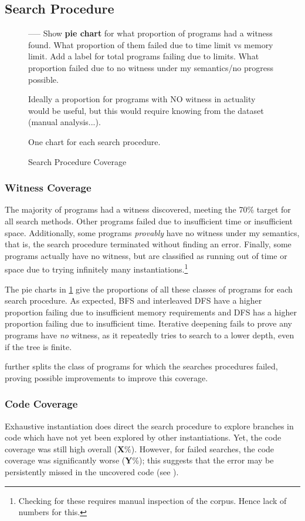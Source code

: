 \subsection{Search Procedure}

\begin{figure}
\centering
-----
Show \textbf{pie chart} for what proportion of programs had a witness found. What proportion of them failed due to time limit vs memory limit. Add a label for total programs failing due to limits. What proportion failed due to no witness under my semantics/no progress possible.

Ideally a proportion for programs with NO witness in actuality would be useful, but this would require knowing from the dataset (manual analysis...).

One chart for each search procedure.
\caption{Search Procedure Coverage}
\label{fig:PieChart}
\end{figure}

\subsubsection{Witness Coverage}
The majority of programs had a witness discovered, meeting the 70\% target for all search methods. Other programs failed due to insufficient time or insufficient space. Additionally, some programs \textit{provably} have no witness under my semantics, that is, the search procedure terminated without finding an error. Finally, some programs actually have no witness, but are classified as running out of time or space due to trying infinitely many instantiations.\footnote{Checking for these requires manual inspection of the corpus. Hence lack of numbers for this.} 

The pie charts in \cref{fig:PieChart} give the proportions of all these classes of programs for each search procedure. As expected, BFS and interleaved DFS have a higher proportion failing due to insufficient memory requirements and DFS has a higher proportion failing due to insufficient time. Iterative deepening fails to prove any programs have \textit{no} witness, as it repeatedly tries to search to a lower depth, even if the tree is finite. 

 further splits the class of programs for which the searches procedures failed, proving possible improvements to improve this coverage.

\subsubsection{Code Coverage}
Exhaustive instantiation does direct the search procedure to explore branches in code which have not yet been explored by other instantiations. Yet, the code coverage was still high overall (\textbf{X}\%). However, for failed searches, the code coverage was significantly worse (\textbf{Y}\%); this suggests that the error may be persistently missed in the uncovered code (see ).

